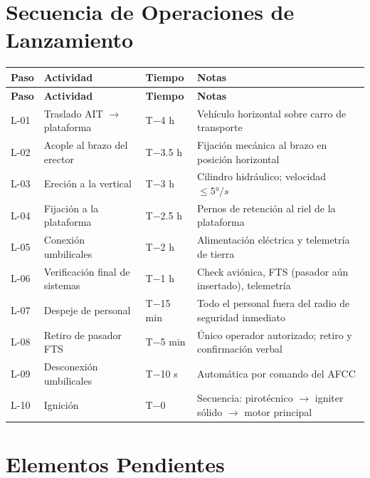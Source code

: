 \documentclass[11pt, a4paper]{article}
\begin{document}
\section{Secuencia de Operaciones de Lanzamiento}

\begin{longtable}{C{1.2cm} L{4cm} C{2cm} L{6.5cm}}
  \color{white}\textbf{Paso} &
  \color{white}\textbf{Actividad} &
  \color{white}\textbf{Tiempo} &
  \color{white}\textbf{Notas} \\
  \endfirsthead
  \color{white}\textbf{Paso} &
  \color{white}\textbf{Actividad} &
  \color{white}\textbf{Tiempo} &
  \color{white}\textbf{Notas} \\
  \endhead
  L-01 & Traslado AIT $\rightarrow$ plataforma & T$-$4 h & Veh\'{i}culo horizontal sobre carro de transporte \\
  L-02 & Acople al brazo del erector & T$-$3.5 h & Fijaci\'{o}n mec\'{a}nica al brazo en posici\'{o}n horizontal \\
  L-03 & Ereci\'{o}n a la vertical & T$-$3 h & Cilindro hidr\'{a}ulico; velocidad $\leq 5°/s$ \\
  L-04 & Fijaci\'{o}n a la plataforma & T$-$2.5 h & Pernos de retenci\'{o}n al riel de la plataforma \\
  L-05 & Conexi\'{o}n umbilicales & T$-$2 h & Alimentaci\'{o}n el\'{e}ctrica y telemetr\'{i}a de tierra \\
  L-06 & Verificaci\'{o}n final de sistemas & T$-$1 h & Check aviónica, FTS (pasador a\'{u}n insertado), telemetr\'{i}a \\
  L-07 & Despeje de personal & T$-$15 min & Todo el personal fuera del radio de seguridad inmediato \\
  L-08 & Retiro de pasador FTS & T$-$5 min & \'{U}nico operador autorizado; retiro y confirmaci\'{o}n verbal \\
  L-09 & Desconexión umbilicales & T$-$10 s & Autom\'{a}tica por comando del AFCC \\
  L-10 & Ignición & T$-$0 & Secuencia: pirot\'{e}cnico $\rightarrow$ igniter s\'{o}lido $\rightarrow$ motor principal \\
\end{longtable}

\section{Elementos Pendientes}
\end{document}
